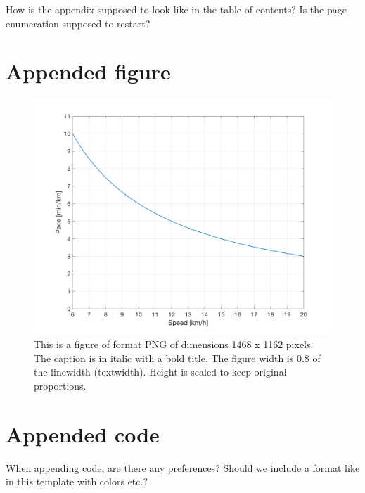 \newpage
\begin{appendices}
    How is the appendix supposed to look like in the table of contents? Is the page enumeration supposed to restart?
    \section{Appended figure}
    \begin{figure}[H]
    	\centering
    	\includegraphics[width=0.8\linewidth]{Figures/PacevsSpeed.png}
    	\caption{This is a figure of format PNG of dimensions 1468 x 1162 pixels. The caption is in italic with a bold title. The figure width is 0.8 of the linewidth (textwidth). Height is scaled to keep original proportions.}
    	\label{Fig:}
    \end{figure}
    \section{Appended code}
    When appending code, are there any preferences? Should we include a format like in this template with colors etc.?
    
\end{appendices}


